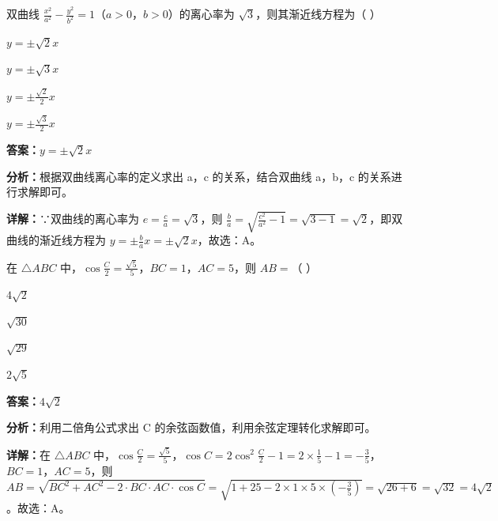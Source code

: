\begin{question}[points=5]
双曲线 $\frac{x^2}{a^2}-\frac{y^2}{b^2}=1$（$a>0$，$b>0$）的离心率为 $\sqrt{3}$，则其渐近线方程为（ ）
\begin{choices}
  \item $y=\pm\sqrt{2}x$
  \item $y=\pm\sqrt{3}x$
  \item $y=\pm\frac{\sqrt{2}}{2}x$
  \item $y=\pm\frac{\sqrt{3}}{2}x$
\end{choices}
\begin{solution}
\textbf{答案：}$y=\pm\sqrt{2}x$

\textbf{分析：}根据双曲线离心率的定义求出 a，c 的关系，结合双曲线 a，b，c 的关系进行求解即可。

\textbf{详解：}∵双曲线的离心率为 $e=\frac{c}{a}=\sqrt{3}$，则 $\frac{b}{a}=\sqrt{\frac{c^2}{a^2}-1}=\sqrt{3-1}=\sqrt{2}$，即双曲线的渐近线方程为 $y=\pm\frac{b}{a}x=\pm\sqrt{2}x$，故选：A。
\end{solution}
\end{question}

\begin{question}[points=5]
在 $\triangle ABC$ 中，$\cos\frac{C}{2}=\frac{\sqrt{5}}{5}$，$BC=1$，$AC=5$，则 $AB=$（ ）
\begin{choices}
  \item $4\sqrt{2}$
  \item $\sqrt{30}$
  \item $\sqrt{29}$
  \item $2\sqrt{5}$
\end{choices}
\begin{solution}
\textbf{答案：}$4\sqrt{2}$

\textbf{分析：}利用二倍角公式求出 C 的余弦函数值，利用余弦定理转化求解即可。

\textbf{详解：}在 $\triangle ABC$ 中，$\cos\frac{C}{2}=\frac{\sqrt{5}}{5}$，$\cos C=2\cos^2\frac{C}{2}-1=2\times\frac{1}{5}-1=-\frac{3}{5}$，$BC=1$，$AC=5$，则 $AB=\sqrt{BC^2+AC^2-2\cdot BC\cdot AC\cdot\cos C}=\sqrt{1+25-2\times1\times5\times(-\frac{3}{5})}=\sqrt{26+6}=\sqrt{32}=4\sqrt{2}$。故选：A。
\end{solution}
\end{question}

